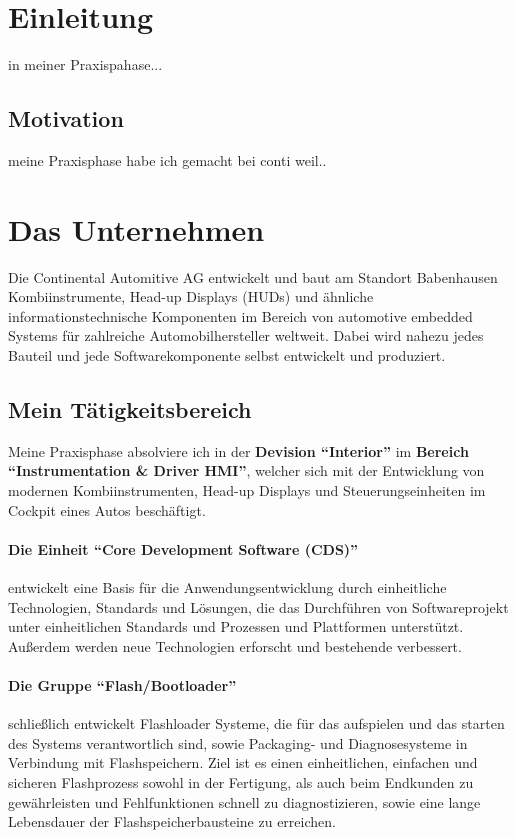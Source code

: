 \section{Einleitung}
in meiner Praxispahase...
\subsection{Motivation}
meine Praxisphase habe ich gemacht bei conti weil..

\section{Das Unternehmen}

Die Continental Automitive AG entwickelt und baut am Standort Babenhausen Kombiinstrumente, Head-up Displays (HUDs) und ähnliche informationstechnische Komponenten im Bereich von automotive embedded Systems für zahlreiche Automobilhersteller weltweit. Dabei wird nahezu jedes Bauteil und jede Softwarekomponente  selbst entwickelt und produziert. 

\subsection{Mein Tätigkeitsbereich}
Meine Praxisphase absolviere ich in der \textbf{Devision "`Interior"'} im \textbf{Bereich "`Instrumentation \& Driver HMI"'}, welcher sich mit der Entwicklung von modernen Kombiinstrumenten, Head-up Displays und Steuerungseinheiten im Cockpit eines Autos beschäftigt.
\paragraph{Die Einheit "`Core Development Software (CDS)"'} entwickelt eine Basis für die Anwendungsentwicklung durch einheitliche Technologien, Standards und Lösungen, die das Durchführen von Softwareprojekt unter einheitlichen Standards und Prozessen und Plattformen unterstützt. Außerdem werden neue Technologien erforscht und bestehende verbessert.  
\paragraph{Die Gruppe "`Flash/Bootloader"'} schließlich entwickelt Flashloader Systeme, die für das aufspielen und das starten des Systems verantwortlich sind, sowie Packaging- und Diagnosesysteme in Verbindung mit Flashspeichern. Ziel ist es einen einheitlichen, einfachen und sicheren Flashprozess sowohl in der Fertigung, als auch beim Endkunden zu gewährleisten und Fehlfunktionen schnell zu diagnostizieren, sowie eine lange Lebensdauer der Flashspeicherbausteine zu erreichen.



